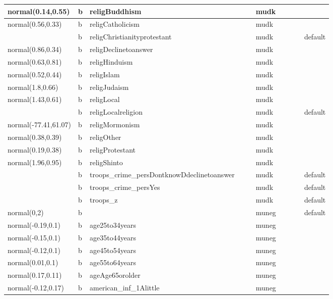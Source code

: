 \documentclass[
]{book}
\theoremstyle{definition}
\theoremstyle{definition}
\theoremstyle{definition}
\theoremstyle{definition}
\theoremstyle{remark}
\begin{document}
\begin{table}
\begin{tabular}[t]{l|l|l|l|l|l|l|l|l|l}
\hline
normal(0.14,0.55) & b & religBuddhism &  &  & mudk &  &  &  & \\
\hline
normal(0.56,0.33) & b & religCatholicism &  &  & mudk &  &  &  & \\
\hline
 & b & religChristianityprotestant &  &  & mudk &  &  &  & default\\
\hline
normal(0.86,0.34) & b & religDeclinetoanswer &  &  & mudk &  &  &  & \\
\hline
normal(0.63,0.81) & b & religHinduism &  &  & mudk &  &  &  & \\
\hline
normal(0.52,0.44) & b & religIslam &  &  & mudk &  &  &  & \\
\hline
normal(1.8,0.66) & b & religJudaism &  &  & mudk &  &  &  & \\
\hline
normal(1.43,0.61) & b & religLocal &  &  & mudk &  &  &  & \\
\hline
 & b & religLocalreligion &  &  & mudk &  &  &  & default\\
\hline
normal(-77.41,61.07) & b & religMormonism &  &  & mudk &  &  &  & \\
\hline
normal(0.38,0.39) & b & religOther &  &  & mudk &  &  &  & \\
\hline
normal(0.19,0.38) & b & religProtestant &  &  & mudk &  &  &  & \\
\hline
normal(1.96,0.95) & b & religShinto &  &  & mudk &  &  &  & \\
\hline
 & b & troops\_crime\_persDontknowDdeclinetoanswer &  &  & mudk &  &  &  & default\\
\hline
 & b & troops\_crime\_persYes &  &  & mudk &  &  &  & default\\
\hline
 & b & troops\_z &  &  & mudk &  &  &  & default\\
\hline
normal(0,2) & b &  &  &  & muneg &  &  &  & default\\
\hline
normal(-0.19,0.1) & b & age25to34years &  &  & muneg &  &  &  & \\
\hline
normal(-0.15,0.1) & b & age35to44years &  &  & muneg &  &  &  & \\
\hline
normal(-0.12,0.1) & b & age45to54years &  &  & muneg &  &  &  & \\
\hline
normal(0.01,0.1) & b & age55to64years &  &  & muneg &  &  &  & \\
\hline
normal(0.17,0.11) & b & ageAge65orolder &  &  & muneg &  &  &  & \\
\hline
normal(-0.12,0.17) & b & american\_inf\_1Alittle &  &  & muneg &  &  &  & \\
\hline

\end{tabular}
\end{table}
\end{document}
